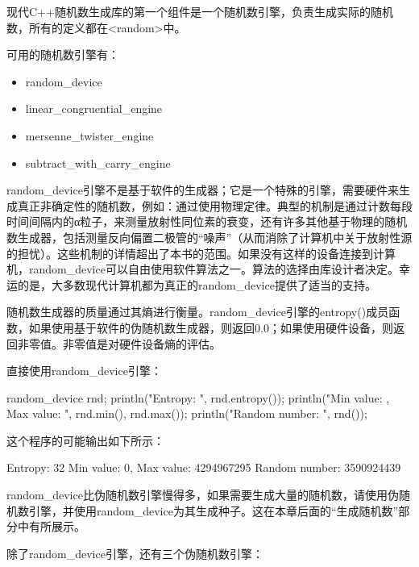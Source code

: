 现代C++随机数生成库的第一个组件是一个随机数引擎，负责生成实际的随机数，所有的定义都在<random>中。

可用的随机数引擎有：

\begin{itemize}
\item
random\_device

\item
linear\_congruential\_engine

\item
mersenne\_twister\_engine

\item
subtract\_with\_carry\_engine
\end{itemize}

random\_device引擎不是基于软件的生成器；它是一个特殊的引擎，需要硬件来生成真正非确定性的随机数，例如：通过使用物理定律。典型的机制是通过计数每段时间间隔内的α粒子，来测量放射性同位素的衰变，还有许多其他基于物理的随机数生成器，包括测量反向偏置二极管的“噪声”（从而消除了计算机中关于放射性源的担忧）。这些机制的详情超出了本书的范围。如果没有这样的设备连接到计算机，random\_device可以自由使用软件算法之一。算法的选择由库设计者决定。幸运的是，大多数现代计算机都为真正的random\_device提供了适当的支持。

随机数生成器的质量通过其熵进行衡量。random\_device引擎的entropy()成员函数，如果使用基于软件的伪随机数生成器，则返回0.0；如果使用硬件设备，则返回非零值。非零值是对硬件设备熵的评估。

直接使用random\_device引擎：

\begin{cpp}
random_device rnd;
println("Entropy: {}", rnd.entropy());
println("Min value: {}, Max value: {}", rnd.min(), rnd.max());
println("Random number: {}", rnd());
\end{cpp}

这个程序的可能输出如下所示：

\begin{shell}
Entropy: 32
Min value: 0, Max value: 4294967295
Random number: 3590924439
\end{shell}

random\_device比伪随机数引擎慢得多，如果需要生成大量的随机数，请使用伪随机数引擎，并使用random\_device为其生成种子。这在本章后面的“生成随机数”部分中有所展示。

除了random\_device引擎，还有三个伪随机数引擎：

